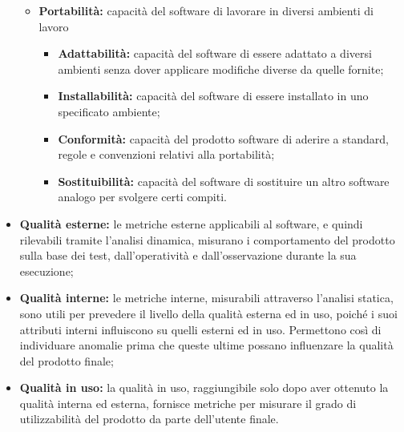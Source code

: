 \begin{itemize}
\begin{itemize}
\begin{itemize}
						\end{itemize}
					\item \textbf{Portabilità:} capacità del software di lavorare in diversi ambienti di lavoro
						\begin{itemize}
							\item \textbf{Adattabilità:} capacità del software di essere adattato a diversi ambienti senza dover applicare modifiche diverse da quelle fornite;
							\item \textbf{Installabilità:} capacità del software di essere installato in uno specificato ambiente;
							\item \textbf{Conformità:} capacità del prodotto software di aderire a standard, regole e convenzioni relativi alla portabilità;
							\item \textbf{Sostituibilità:} capacità del software di sostituire un altro software analogo per svolgere certi compiti.
						\end{itemize}
				\end{itemize}
			\item \textbf{Qualità esterne: } le metriche esterne applicabili al software, e quindi rilevabili tramite l'analisi dinamica, misurano i comportamento del prodotto sulla base dei test, dall'operatività e dall'osservazione durante la sua esecuzione;
			\item \textbf{Qualità interne: } le metriche interne, misurabili attraverso l'analisi statica, sono utili per prevedere il livello della qualità esterna ed in uso, poiché i suoi attributi interni influiscono su quelli esterni ed in uso. Permettono così di individuare anomalie prima che queste ultime possano influenzare la qualità del prodotto finale;
			\item \textbf{Qualità in uso: } la qualità in uso, raggiungibile solo dopo aver ottenuto la qualità interna ed esterna, fornisce metriche per misurare il grado di utilizzabilità del prodotto da parte dell'utente finale.
		\end{itemize}
		
